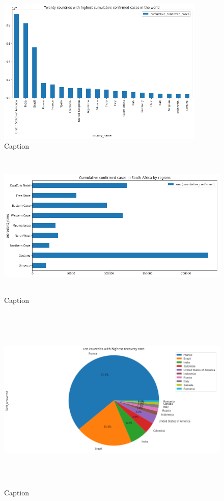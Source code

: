 \documentclass[11pt]{article}
\begin{document}
\begin{figure}[h]
\includegraphics[width=0.7\linewidth, height=7cm]{bar1.png}
\caption{Caption}
\label{fig:figure3}
\end{figure}


\begin{figure}[h]
\includegraphics[width=0.7\linewidth, height=7cm]{bar2.png}
\caption{Caption}
\label{fig:figure4}
\end{figure}


\begin{figure}[h]
\centering
\includegraphics[width=0.5\linewidth, height=9cm]{pie1.png}
\caption{Caption}
\label{fig:figure5}
\end{figure}
\end{document}
